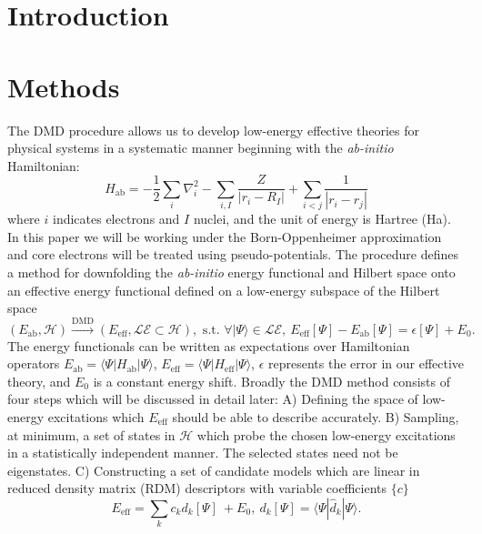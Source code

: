 \documentclass{article}
\begin{document}
\section{Introduction}

\section{Methods}
The DMD procedure allows us to develop low-energy effective theories for physical systems in a systematic manner beginning with the \textit{ab-initio} Hamiltonian:
\begin{equation}
H_\text{ab} = -\frac{1}{2} \sum_{i} \nabla_i^2 - \sum_{i,I}\frac{Z}{|r_i - R_I|} + \sum_{i<j}\frac{1}{|r_i - r_j|}
\label{eq:Hab}
\end{equation}
where $i$ indicates electrons and $I$ nuclei, and the unit of energy is Hartree (Ha).
In this paper we will be working under the Born-Oppenheimer approximation and core electrons will be treated using pseudo-potentials.
The procedure defines a method for downfolding the \textit{ab-initio} energy functional and Hilbert space onto an effective energy functional defined on a low-energy subspace of the Hilbert space 
\begin{equation}
(E_\text{ab}, \mathcal{H}) \xrightarrow{\text{DMD}} (E_\text{eff}, \mathcal{LE} \subset \mathcal{H}), \text{ s.t. }
\forall |\Psi\rangle \in \mathcal{LE}, \ E_\text{eff}[\Psi] - E_\text{ab}[\Psi] = \epsilon[\Psi] + E_0.
\label{eq:DMD}
\end{equation} 
The energy functionals can be written as expectations over Hamiltonian operators $E_\text{ab} = \langle \Psi | H_\text{ab} |\Psi \rangle$, $E_\text{eff} = \langle \Psi | H_\text{eff} |\Psi \rangle$, $\epsilon$ represents the error in our effective theory, and $E_0$ is a constant energy shift.
Broadly the DMD method consists of four steps which will be discussed in detail later: 
A) Defining the space of low-energy excitations which $E_\text{eff}$ should be able to describe accurately.
B) Sampling, at minimum, a set of states in $\mathcal{H}$ which probe the chosen low-energy excitations in a statistically independent manner. The selected states need not be eigenstates. 
C) Constructing a set of candidate models which are linear in reduced density matrix (RDM) descriptors with variable coefficients $\{c\}$
\begin{equation}
E_\text{eff} = \sum_k c_k d_k[\Psi]\ + E_0,\ d_k[\Psi] = \langle \Psi | \hat{d}_k |\Psi \rangle.
\label{eq:Eeff}
\end{equation}
\end{document}
